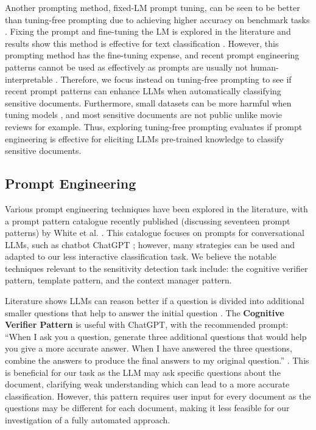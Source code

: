 Another prompting method, fixed-LM prompt tuning, can be seen to be better than tuning-free prompting due to achieving higher accuracy on benchmark tasks \cite{liu2023pre}. Fixing the prompt and fine-tuning the LM is explored in the literature and results show this method is effective for text classification \cite{yin2019benchmarking}. However, this prompting method has the fine-tuning expense, and recent prompt engineering patterns \cite{white2023prompt} cannot be used as effectively as prompts are usually not human-interpretable \cite{liu2023pre}. Therefore, we focus instead on tuning-free prompting to see if recent prompt patterns can enhance LLMs when automatically classifying sensitive documents. Furthermore, small datasets can be more harmful when tuning models \cite{zhao2023survey}, and most sensitive documents are not public unlike movie reviews for example. Thus, exploring tuning-free prompting evaluates if prompt engineering is effective for eliciting LLMs pre-trained knowledge to classify sensitive documents.

\subsection{Prompt Engineering}
\label{sec:background:prompt_engineering}
Various prompt engineering techniques have been explored in the literature, with a prompt pattern catalogue recently published (discussing seventeen prompt patterns) by White et al. \cite{white2023prompt}. This catalogue focuses on prompts for conversational LLMs, such as chatbot ChatGPT \cite{brown2020language}; however, many strategies can be used and adapted to our less interactive classification task. We believe the notable techniques relevant to the sensitivity detection task include: the cognitive verifier pattern, template pattern, and the context manager pattern.

Literature shows LLMs can reason better if a question is divided into additional smaller questions that help to answer the initial question \cite{zhou2022large}. The \textbf{Cognitive Verifier Pattern} is useful with ChatGPT, with the recommended prompt: “When I ask you a question, generate three additional questions that would help you give a more accurate answer. When I have answered the three questions, combine the answers to produce the final answers to my original question.” \cite{white2023prompt}. This is beneficial for our task as the LLM may ask specific questions about the document, clarifying weak understanding which can lead to a more accurate classification. However, this pattern requires user input for every document as the questions may be different for each document, making it less feasible for our investigation of a fully automated approach.

